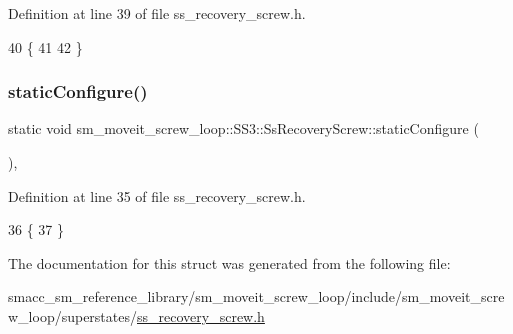 Definition at line 39 of file ss\+\_\+recovery\+\_\+screw.\+h.


\begin{DoxyCode}
40             \{
41                 
42             \}
\end{DoxyCode}
\mbox{\label{structsm__moveit__screw__loop_1_1SS3_1_1SsRecoveryScrew_a76a6b8e0ef9b53e93014b19cddc21936}} 
\subsubsection{\texorpdfstring{static\+Configure()}{staticConfigure()}}
{\footnotesize\ttfamily static void sm\+\_\+moveit\+\_\+screw\+\_\+loop\+::\+S\+S3\+::\+Ss\+Recovery\+Screw\+::static\+Configure (\begin{DoxyParamCaption}{ }\end{DoxyParamCaption})\hspace{0.3cm}{\ttfamily [inline]}, {\ttfamily [static]}}



Definition at line 35 of file ss\+\_\+recovery\+\_\+screw.\+h.


\begin{DoxyCode}
36             \{
37             \}
\end{DoxyCode}


The documentation for this struct was generated from the following file\+:\begin{DoxyCompactItemize}
\item 
smacc\+\_\+sm\+\_\+reference\+\_\+library/sm\+\_\+moveit\+\_\+screw\+\_\+loop/include/sm\+\_\+moveit\+\_\+screw\+\_\+loop/superstates/\hyperlink{ss__recovery__screw_8h}{ss\+\_\+recovery\+\_\+screw.\+h}\end{DoxyCompactItemize}
